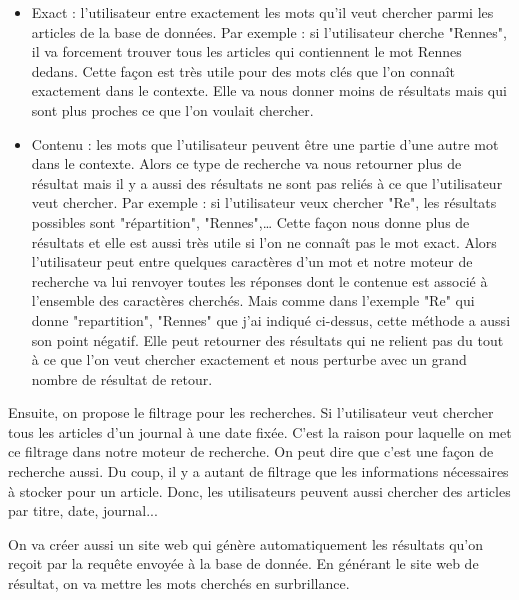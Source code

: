 \begin{itemize}
\item Exact : l'utilisateur entre exactement les mots qu'il veut chercher parmi les articles de la base de données. Par exemple : si l'utilisateur cherche "Rennes", il va forcement trouver tous les articles qui contiennent le mot Rennes dedans. Cette façon est très utile pour des mots clés que l’on connaît exactement dans le contexte. Elle va nous donner moins de résultats mais qui sont plus proches ce que l’on voulait chercher.
\item Contenu : les mots que l'utilisateur peuvent être une partie d'une autre mot dans le contexte. Alors ce type de recherche va nous retourner plus de résultat mais il y a aussi des résultats ne sont pas reliés à ce que l'utilisateur veut chercher. Par exemple : si l'utilisateur veux chercher "Re", les résultats possibles sont "répartition", "Rennes",… Cette façon nous donne plus de résultats et elle est aussi très utile si l’on ne connaît pas le mot exact. Alors l’utilisateur peut entre quelques caractères d’un mot et notre moteur de recherche va lui renvoyer toutes les réponses dont le contenue est associé à l’ensemble des caractères cherchés. Mais comme dans l’exemple "Re" qui donne "repartition", "Rennes" que j’ai indiqué ci-dessus, cette méthode a aussi son point négatif. Elle peut retourner des résultats qui ne relient pas du tout à ce que l’on veut chercher exactement et nous perturbe avec un grand nombre de résultat de retour.
\end{itemize}

	Ensuite, on propose le filtrage pour les recherches. Si l'utilisateur veut chercher tous les articles d’un journal à une date fixée. C’est la raison pour laquelle on met ce filtrage dans notre moteur de recherche. On peut dire que c’est une façon de recherche aussi. Du coup, il y a autant de filtrage que les informations nécessaires à stocker pour un article. Donc, les utilisateurs peuvent aussi chercher des articles par titre, date, journal... %
 

On va créer aussi un site web qui génère automatiquement les résultats qu'on reçoit par la requête envoyée à la base de donnée. En générant le site web de résultat, on va mettre les mots cherchés en surbrillance. 
